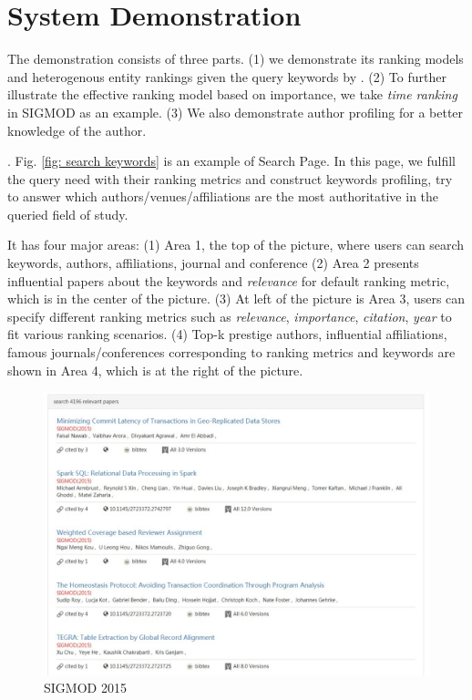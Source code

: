 \section{System Demonstration}
\par The demonstration consists of three parts. (1) we demonstrate its ranking models and heterogenous entity rankings given the query keywords by \oursystem. (2) To further illustrate the effective ranking model based on importance, we take {\em time ranking} in SIGMOD as an example. (3) We also demonstrate author profiling for a better knowledge of the author.


. Fig. \ref{fig: search keywords} is an example of Search Page. In this page, we fulfill the query need with their ranking metrics and construct keywords profiling,
try to answer which authors/venues/affiliations are the most authoritative in the queried field of study.

\par

It has four major areas: (1) Area 1, the top of the picture, where users can search keywords, authors, affiliations, journal and conference (2) Area 2 presents influential papers about the keywords and {\em relevance} for default ranking metric, which is in the center of the picture. (3) At left of the picture is Area 3, users can specify different ranking metrics such as {\em relevance}, {\em importance}, {\em citation}, {\em year} to fit various ranking scenarios. (4) Top-k prestige authors, influential affiliations, famous journals/conferences corresponding to ranking metrics and keywords are shown in Area 4, which is at the right of the picture.




\begin{figure}
\centering
\includegraphics[width=\columnwidth]{sigmod15.pdf}
\caption{SIGMOD 2015}
\label{fig:sigmod}
\vspace{-3ex}
\end{figure}



